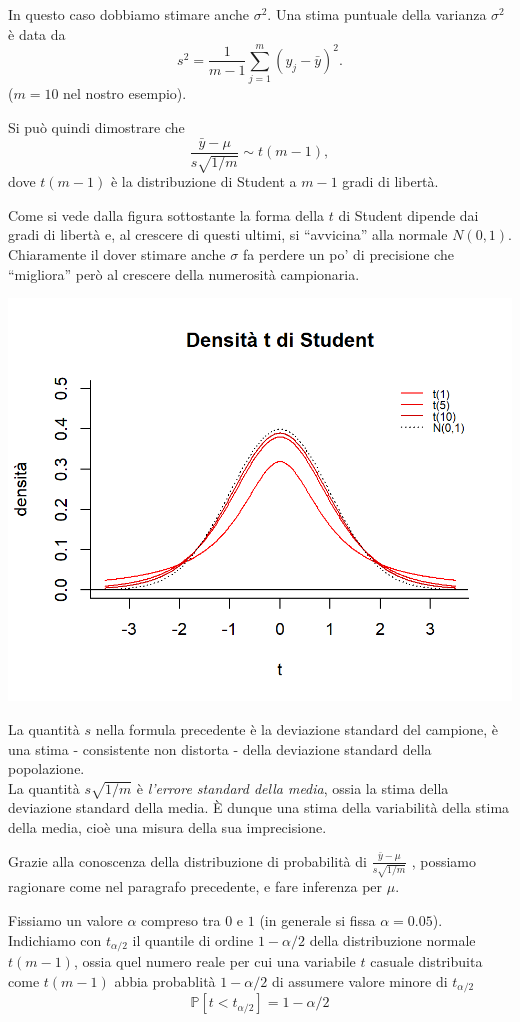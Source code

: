 \documentclass[
  11pt,
]{book}
\begin{document}
In questo caso dobbiamo stimare anche \(\sigma^2\). Una stima puntuale della varianza \(\sigma^2\) è data da
\[
s^2 = \frac{1}{m-1}\sum_{j=1}^m (y_j-\bar y)^2.
\]
(\(m=10\) nel nostro esempio).

Si può quindi dimostrare che
\[
\frac{\bar y - \mu}{s \sqrt{1/m}} \sim t(m-1),
\]
dove \(t(m-1)\) è la distribuzione di Student a \(m-1\) gradi di libertà.

Come si vede dalla figura sottostante la forma della \(t\) di Student dipende dai gradi di libertà e, al crescere di questi ultimi, si ``avvicina'' alla normale \(N(0,1)\). Chiaramente il dover stimare anche \(\sigma\) fa perdere un po' di precisione che ``migliora'' però al crescere della numerosità campionaria.

\begin{center}\includegraphics[width=0.5\linewidth]{Immagini/Inferenziale/student} \end{center}

La quantità \(s\) nella formula precedente è la deviazione standard del campione,
è una stima - consistente non distorta - della deviazione standard della popolazione.\\
La quantità \(s \sqrt{1/m}\) è \emph{l'errore standard della media},
ossia la stima della deviazione standard della media.
È dunque una stima della variabilità della stima della media, cioè una misura della sua imprecisione.

Grazie alla conoscenza della distribuzione di probabilità di \(\frac{\bar y - \mu}{s \sqrt{1/m}}\) , possiamo ragionare come nel paragrafo precedente, e fare inferenza per \(\mu\).

Fissiamo un valore \(\alpha\) compreso tra \(0\) e \(1\) (in generale si fissa \(\alpha=0.05\)). Indichiamo con \(t_{\alpha/2}\) il quantile di ordine \(1-\alpha/2\) della distribuzione normale \(t(m-1)\), ossia quel numero reale per cui una variabile \(t\) casuale distribuita come \(t(m-1)\) abbia probablità \(1-\alpha/2\) di assumere valore minore di \(t_{\alpha/2}\)
\[
\mathbb{P}[t < t_{\alpha/2}] = 1-\alpha/2
\]
\end{document}

